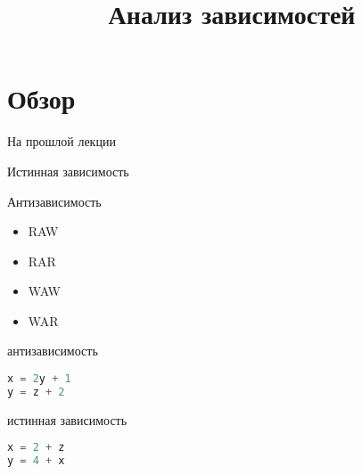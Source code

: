 

\title{Анализ зависимостей}



\begin{frame}
\titlepage
\end{frame}

\section{Обзор}

\begin{frame}
\tableofcontents
\end{frame} 

\begin{frame}{На прошлой лекции}
\end{frame}


\begin{frame}

Истинная зависимость

Антизависимость

\end{frame}

\begin{frame}

\begin{itemize}
  \item RAW
  \item RAR
  \item WAW
  \item WAR
\end{itemize}

\end{frame}

\begin{frame}[fragile]

антизависимость

\begin{lstlisting}[language=C,basicstyle=\ttfamily,keywordstyle=\color{blue},basicstyle=\scriptsize]
x = 2y + 1
y = z + 2
\end{lstlisting}

\end{frame}

\begin{frame}[fragile]

истинная зависимость

\begin{lstlisting}[language=C,basicstyle=\ttfamily,keywordstyle=\color{blue},basicstyle=\scriptsize]
x = 2 + z
y = 4 + x
\end{lstlisting}

\end{frame}


